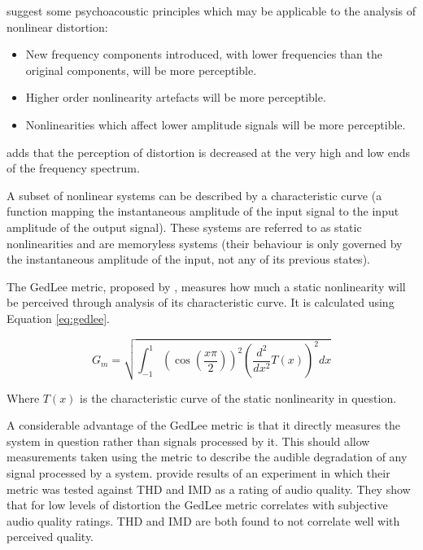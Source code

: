 		\citet{geddes2003auditory} suggest some psychoacoustic principles which may be applicable to the analysis
		of nonlinear distortion:

		\begin{itemize}
			\item New frequency components introduced, with lower frequencies than the original components,
				will be more perceptible.
			\item Higher order nonlinearity artefacts will be more perceptible.
			\item Nonlinearities which affect lower amplitude signals will be more perceptible.
		\end{itemize}

		\citet{voishvillo2006assessment} adds that the perception of distortion is decreased at the very high and
		low ends of the frequency spectrum.

		A subset of nonlinear systems can be described by a characteristic curve (a function mapping the
		instantaneous amplitude of the input signal to the input amplitude of the output signal). These systems are
		referred to as static nonlinearities and are memoryless systems (their behaviour is only governed by the
		instantaneous amplitude of the input, not any of its previous states).

		The GedLee metric, proposed by \citet{geddes2003auditory}, measures how much a static nonlinearity will be
		perceived through analysis of its characteristic curve. It is calculated using Equation \ref{eq:gedlee}.

		\begin{equation}
			G_{m} = \sqrt{\int_{-1}^{1} \left( \cos \left( \frac{x\pi}{2} \right) \right)^{2}
				      \left( \frac{d^{2}}{dx^{2}} T(x) \right)^{2} dx}
			\label{eq:gedlee}
		\end{equation}

		Where $T(x)$ is the characteristic curve of the static nonlinearity in question.

		A considerable advantage of the GedLee metric is that it directly measures the system in question rather
		than signals processed by it. This should allow measurements taken using the metric to describe the audible
		degradation of any signal processed by a system. \citet{lee2003auditory} provide results of an experiment
		in which their metric was tested against THD and IMD as a rating of audio quality. They show that for low
		levels of distortion the GedLee metric correlates with subjective audio quality ratings. THD and IMD are
		both found to not correlate well with perceived quality.

